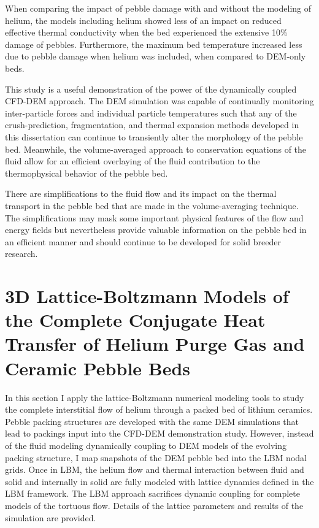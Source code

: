 When comparing the impact of pebble damage with and without the modeling of helium, the models including helium showed less of an impact on reduced effective thermal conductivity when the bed experienced the extensive 10\% damage of pebbles. Furthermore, the maximum bed temperature increased less due to pebble damage when helium was included, when compared to DEM-only beds.

This study is a useful demonstration of the power of the dynamically coupled CFD-DEM approach. The DEM simulation was capable of continually monitoring inter-particle forces and individual particle temperatures such that any of the crush-prediction, fragmentation, and thermal expansion methods developed in this dissertation can continue to transiently alter the morphology of the pebble bed. Meanwhile, the volume-averaged approach to conservation equations of the fluid allow for an efficient overlaying of the fluid contribution to the thermophysical behavior of the pebble bed.

There are simplifications to the fluid flow and its impact on the thermal transport in the pebble bed that are made in the volume-averaging technique. The simplifications may mask some important physical features of the flow and energy fields but nevertheless provide valuable information on the pebble bed in an efficient manner and should continue to be developed for solid breeder research.



\section{3D Lattice-Boltzmann Models of the Complete Conjugate Heat Transfer of Helium Purge Gas and Ceramic Pebble Beds}\label{sec:lbm-studies}

In this section I apply the lattice-Boltzmann numerical modeling tools to study the complete interstitial flow of helium through a packed bed of lithium ceramics. Pebble packing structures are developed with the same DEM simulations that lead to packings input into the CFD-DEM demonstration study. However, instead of the fluid modeling dynamically coupling to DEM models of the evolving packing structure, I map snapshots of the DEM pebble bed into the LBM nodal grids. Once in LBM, the helium flow and thermal interaction between fluid and solid and internally in solid are fully modeled with lattice dynamics defined in the LBM framework. The LBM approach sacrifices dynamic coupling for complete models of the tortuous flow. Details of the lattice parameters and results of the simulation are provided.


